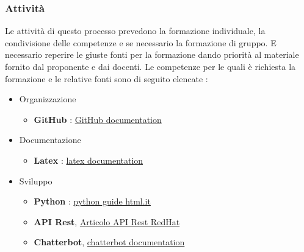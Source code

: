 \subsubsection{Attività}
Le attività di questo processo prevedono la formazione individuale, la condivisione delle competenze e se necessario la formazione di gruppo. E necessario reperire le giuste fonti per la formazione dando priorità al materiale fornito dal proponente e dai docenti. Le competenze per le quali è richiesta la formazione e le relative fonti sono di seguito elencate :
\begin{itemize}
	\item Organizzazione
		\begin{itemize}		
			\item \textbf{GitHub} : \href{https://docs.github.com/en}{GitHub documentation}
		\end{itemize}
	\item Documentazione
		\begin{itemize}
			\item \textbf{Latex} : \href{https://www.latex-project.org/help/}{latex documentation}
		\end{itemize}
	\item Sviluppo
		\begin{itemize}
			\item \textbf{Python} : \href{https://www.html.it/guide/guida-python/}{python guide html.it}
			\item \textbf{API Rest}, \href{https://www.redhat.com/it/topics/api/what-is-a-rest-api}{Articolo API Rest RedHat}
			\item \textbf{Chatterbot}, \href{https://chatterbot.readthedocs.io/en/stable/}{chatterbot documentation}
		\end{itemize}
\end{itemize}